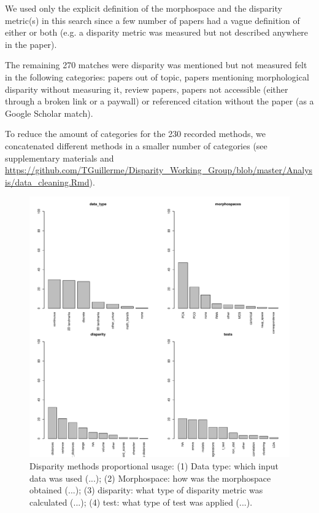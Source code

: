 \documentclass[12pt,letterpaper]{article}
\begin{document}
We used only the explicit definition of the morphospace and the disparity metric(s) in this search since a few number of papers had a vague definition of either or both (e.g. a disparity metric was measured but not described anywhere in the paper).

The remaining 270 matches were disparity was mentioned but not measured felt in the following categories: papers out of topic, papers mentioning morphological disparity without measuring it, review papers, papers not accessible (either through a broken link or a paywall) or referenced citation without the paper (as a Google Scholar match).

To reduce the amount of categories for the 230 recorded methods, we concatenated different methods in a smaller number of categories (see supplementary materials and \url{https://github.com/TGuillerme/Disparity_Working_Group/blob/master/Analysis/data_cleaning.Rmd}).

\begin{figure}[!htbp]
\centering
   \includegraphics[width=1\textwidth]{Figures/MethodsProportions.pdf} 
\caption{Disparity methods proportional usage: (1) Data type: which input data was used (...); (2) Morphospace: how was the morphospace obtained (...); (3) disparity: what type of disparity metric was calculated (...); (4) test: what type of test was applied (...).}
\label{Fig:MethodsProportions}
\end{figure}
\end{document}
